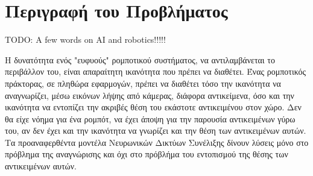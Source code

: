 \section{Περιγραφή του Προβλήματος}
\label{section:problem_description}

TODO: A few words on AI and robotics!!!!!

Η δυνατότητα ενός "ευφυούς" ρομποτικού συστήματος, να αντιλαμβάνεται
το περιβάλλον του, είναι απαραίτητη ικανότητα που πρέπει να διαθέτει.
Ένας ρομποτικός πράκτορας, σε πληθώρα εφαρμογών, πρέπει να διαθέτει τόσο την
ικανότητα να αναγνωρίζει, μέσω εικόνων λήψης από κάμερας, διάφορα αντικείμενα,
όσο και την ικανότητα να εντοπίζει την ακριβές θέση του
εκάστοτε αντικειμένου στον χώρο. Δεν θα είχε νόημα για ένα ρομπότ, να έχει άποψη
για την παρουσία αντικειμένων γύρω του, αν δεν έχει και την ικανότητα να γνωρίζει
και την θέση των αντικειμένων αυτών. Τα προαναφερθέντα μοντέλα Νευρωνικών
Δικτύων Συνέλιξης δίνουν λύσεις μόνο στο πρόβλημα της αναγνώρισης και όχι
στο πρόβλήμα του εντοπισμού της θέσης των αντικειμένων αυτών.

